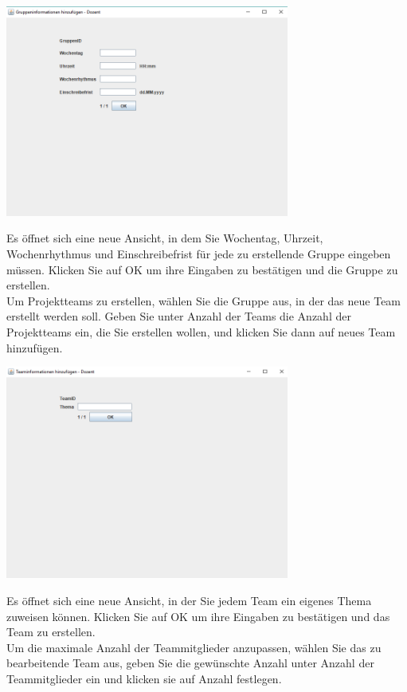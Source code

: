 \documentclass{Handbuch}
\begin{document}
\begin{center}
	\includegraphics[width=0.7\textwidth]{img_DozentenGUI_13.png}
\end{center}Es öffnet sich eine neue Ansicht, in dem Sie Wochentag, Uhrzeit, Wochenrhythmus und Einschreibefrist für jede zu erstellende Gruppe eingeben müssen. Klicken Sie auf \frqq OK\flqq{} um ihre Eingaben zu bestätigen und die Gruppe zu erstellen. \\
Um Projektteams zu erstellen, wählen Sie die Gruppe aus, in der das neue Team erstellt werden soll. Geben Sie unter \glqq Anzahl der Teams\grqq{} die Anzahl der Projektteams ein, die Sie erstellen wollen, und klicken Sie dann auf \frqq neues Team hinzufügen\flqq. 
\begin{center}
	\includegraphics[width=0.7\textwidth]{img_DozentenGUI_14.png}
\end{center}Es öffnet sich eine neue Ansicht, in der Sie jedem Team ein eigenes Thema zuweisen können. Klicken Sie auf \frqq OK\flqq{} um ihre Eingaben zu bestätigen und das Team zu erstellen. \\
Um die maximale Anzahl der Teammitglieder anzupassen, wählen Sie das zu bearbeitende Team aus, geben Sie die gewünschte Anzahl unter  \glqq Anzahl der Teammitglieder\grqq{} ein und klicken sie auf \frqq Anzahl festlegen\flqq.\\
\end{document}
